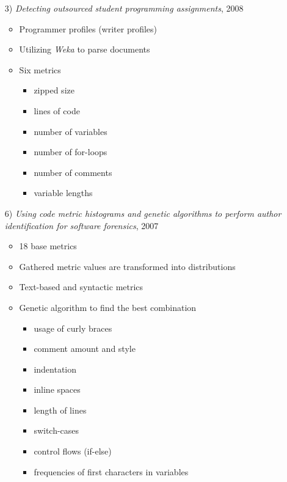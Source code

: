\documentclass[t,12pt,pdftex]{beamer}
\begin{document}
\begin{frame}
	\vspace{0.5in}
	\begin{itemize}
		\item[3)] \textit{Detecting outsourced student
programming assignments}, 2008
		\begin{itemize}
			\item Programmer profiles (writer profiles)
			\item Utilizing \textit{Weka} to parse documents
			\item Six metrics
			\begin{itemize}
				\item zipped size
				\item lines of code
				\item number of variables
				\item number of for-loops
				\item number of comments
				\item variable lengths
			\end{itemize}
		\end{itemize}
	\end{itemize}
\end{frame}

\begin{frame}
	\vspace{0.5in}
	\begin{itemize}
		\item[6)] \textit{Using code metric histograms and genetic algorithms to perform author identification for software forensics}, 2007
		\begin{itemize}
			\item 18 base metrics 
			\item Gathered metric values are transformed into distributions
			\item Text-based and syntactic metrics
			\item Genetic algorithm to find the best combination
			\begin{itemize}
				\item usage of curly braces
				\item comment amount and style
				\item indentation
				\item inline spaces
				\item length of lines
				\item switch-cases
				\item control flows (if-else)
				\item frequencies of first characters in variables
			\end{itemize}
		\end{itemize}
	\end{itemize}
\end{frame}
\end{document}
